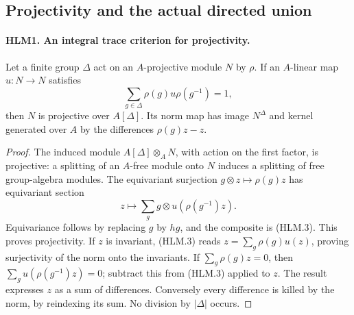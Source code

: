 \documentclass[11pt,a4paper]{article}
\numberwithin{equation}{section}
\theoremstyle{remark}\newtheorem{remark}[theorem]{Remark}
\begin{document}
\subsection{Projectivity and the actual directed union}

\paragraph{HLM1. An integral trace criterion for projectivity.}
\label{claim:HLM1}
Let a finite group \(\Delta\) act on an \(A\)-projective module
\(N\) by \(\rho\).  If an \(A\)-linear map \(u:N\to N\)
satisfies
\[
             \sum_{g\in\Delta}\rho(g)u\rho(g^{-1})=1,
 \tag{HLM.3}
\]
then \(N\) is projective over \(A[\Delta]\).
Its norm map has image \(N^\Delta\) and kernel generated over
\(A\) by the differences \(\rho(g)z-z\).
\begin{proof}
The induced module \(A[\Delta]\otimes_A N\), with action on
the first factor, is projective: a splitting of an \(A\)-free
module onto \(N\) induces a splitting of free group-algebra
modules.  The equivariant surjection
\(g\otimes z\mapsto\rho(g)z\) has equivariant section
\[
               z\longmapsto
                 \sum_g g\otimes u(\rho(g^{-1})z).
\]
Equivariance follows by replacing \(g\) by \(hg\), and the
composite is (HLM.3).  This proves projectivity.
If \(z\) is invariant, (HLM.3) reads
\(z=\sum_g\rho(g)u(z)\), proving surjectivity of the norm
onto the invariants.  If \(\sum_g\rho(g)z=0\), then
\(\sum_g u(\rho(g^{-1})z)=0\); subtract this from (HLM.3)
applied to \(z\).  The result expresses \(z\) as a sum of
differences.  Conversely every difference is killed by the norm,
by reindexing its sum.  No division by \(|\Delta|\) occurs.
\end{proof}

\end{document}

